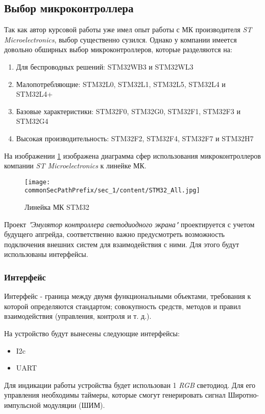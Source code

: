 \subsection{Выбор микроконтроллера}

Так как автор курсовой работы уже имел опыт работы с МК производителя \textit{ST Microelectronics}, выбор существенно сузился. Однако у компании имеется довольно обширных выбор микроконтроллеров, которые разделяются на:
\begin{enumerate}
    \item Для беспроводных решений: STM32WB3 и STM32WL3
    \item Малопотребляющие:  STM32L0, STM32L1,  STM32L5, STM32L4 и STM32L4+
    \item Базовые характеристики: STM32F0, STM32G0, STM32F1, STM32F3 и STM32G4
    \item Высокая производительность: STM32F2, STM32F4, STM32F7 и STM32H7   
\end{enumerate}

На изображении \ref{fig:stm32_options} изображена диаграмма сфер использования микроконтроллеров компании \textit{ST Microelectronics} к линейке МК.
\begin{figure}[ht]
    \centering
    \texttt{[image: \\commonSecPathPrefix/sec\_1/content/STM32\_All.jpg]}
    \caption{Линейка МК STM32}
    \label{fig:stm32_options}
\end{figure}

Проект \textit{"Эмулятор контроллера светодиодного экрана"} проектируется с учетом будущего апгрейда, соответственно важно предусмотреть возможность подключения внешних систем для взаимодействия с ними. Для этого будут использованы интерфейсы.

\subsubsection{Интерфейс}

Интерфейс - граница между двумя функциональными объектами, требования к которой определяются стандартом; совокупность средств, методов и правил взаимодействия (управления, контроля и т. д.).

На устройство будут вынесены следующие интерфейсы:
\begin{itemize}
    \item I2c
    \item UART
\end{itemize}

Для индикации работы устройства будет использован 1 \textit{RGB} светодиод. Для его управления необходимы таймеры, которые смогут генерировать сигнал Широтно-импульсной модуляции (ШИМ).

